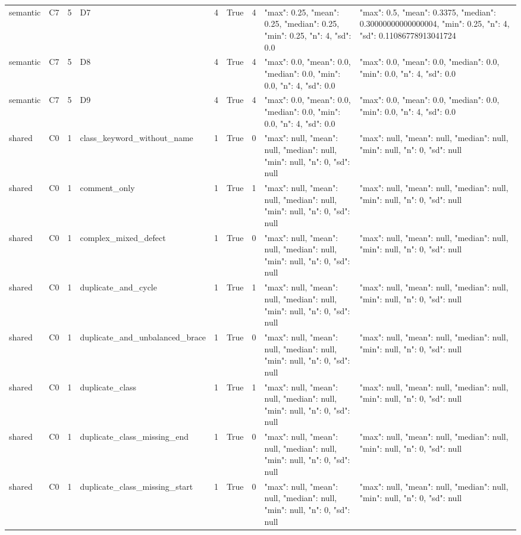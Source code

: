 \begin{tabular}{lllllllll}
semantic & C7 & 5 & D7 & 4 & True & 4 & {"max": 0.25, "mean": 0.25, "median": 0.25, "min": 0.25, "n": 4, "sd": 0.0} & {"max": 0.5, "mean": 0.3375, "median": 0.30000000000000004, "min": 0.25, "n": 4, "sd": 0.11086778913041724} \\
semantic & C7 & 5 & D8 & 4 & True & 4 & {"max": 0.0, "mean": 0.0, "median": 0.0, "min": 0.0, "n": 4, "sd": 0.0} & {"max": 0.0, "mean": 0.0, "median": 0.0, "min": 0.0, "n": 4, "sd": 0.0} \\
semantic & C7 & 5 & D9 & 4 & True & 4 & {"max": 0.0, "mean": 0.0, "median": 0.0, "min": 0.0, "n": 4, "sd": 0.0} & {"max": 0.0, "mean": 0.0, "median": 0.0, "min": 0.0, "n": 4, "sd": 0.0} \\
shared & C0 & 1 & class\_keyword\_without\_name & 1 & True & 0 & {"max": null, "mean": null, "median": null, "min": null, "n": 0, "sd": null} & {"max": null, "mean": null, "median": null, "min": null, "n": 0, "sd": null} \\
shared & C0 & 1 & comment\_only & 1 & True & 1 & {"max": null, "mean": null, "median": null, "min": null, "n": 0, "sd": null} & {"max": null, "mean": null, "median": null, "min": null, "n": 0, "sd": null} \\
shared & C0 & 1 & complex\_mixed\_defect & 1 & True & 0 & {"max": null, "mean": null, "median": null, "min": null, "n": 0, "sd": null} & {"max": null, "mean": null, "median": null, "min": null, "n": 0, "sd": null} \\
shared & C0 & 1 & duplicate\_and\_cycle & 1 & True & 1 & {"max": null, "mean": null, "median": null, "min": null, "n": 0, "sd": null} & {"max": null, "mean": null, "median": null, "min": null, "n": 0, "sd": null} \\
shared & C0 & 1 & duplicate\_and\_unbalanced\_brace & 1 & True & 0 & {"max": null, "mean": null, "median": null, "min": null, "n": 0, "sd": null} & {"max": null, "mean": null, "median": null, "min": null, "n": 0, "sd": null} \\
shared & C0 & 1 & duplicate\_class & 1 & True & 1 & {"max": null, "mean": null, "median": null, "min": null, "n": 0, "sd": null} & {"max": null, "mean": null, "median": null, "min": null, "n": 0, "sd": null} \\
shared & C0 & 1 & duplicate\_class\_missing\_end & 1 & True & 0 & {"max": null, "mean": null, "median": null, "min": null, "n": 0, "sd": null} & {"max": null, "mean": null, "median": null, "min": null, "n": 0, "sd": null} \\
shared & C0 & 1 & duplicate\_class\_missing\_start & 1 & True & 0 & {"max": null, "mean": null, "median": null, "min": null, "n": 0, "sd": null} & {"max": null, "mean": null, "median": null, "min": null, "n": 0, "sd": null} \\

\end{tabular}
